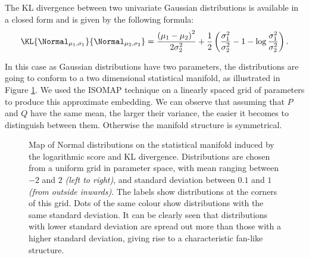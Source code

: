 The KL divergence between two univariate Gaussian distributions is available in a closed form and is given by the following formula:
%
\begin{equation}
	\KL{\Normal_{\mu_1,\sigma_1}}{\Normal_{\mu_2,\sigma_2}} = \frac{\left(\mu_1 - \mu_2\right)^2}{2\sigma_2^2} + \frac{1}{2}\left(\frac{\sigma_1^2}{\sigma_2^2} - 1 - \log\frac{\sigma_1^2}{\sigma_2^2}\right).
\end{equation}

In this case as Gaussian distributions have two parameters, the distributions are going to conform to a two dimensional statistical manifold, as illustrated in Figure \ref{fig:Normal_meanvar}. We used the ISOMAP technique on a linearly spaced grid of parameters to produce this approximate embedding. We can observe that assuming that $P$ and $Q$ have the same mean, the larger their variance, the easier it becomes to distinguish between them. Otherwise the manifold structure is symmetrical.

\begin{figure} %
	\begin{center}
	\end{center}
	\caption[Map of Normal distributions by the KL divergence]{Map of Normal distributions on the statistical manifold induced by the logarithmic score and KL divergence. Distributions are chosen from a uniform grid in parameter space, with mean ranging between $-2$ and $2$ \emph{(left to right)}, and standard deviation between $0.1$ and $1$ \emph{(from outside inwards)}. The labels show distributions at the corners of this grid.  Dots of the same colour show distributions with the same standard deviation. It can be clearly seen that distributions with lower standard deviation are spread out more than those with a higher standard deviation, giving rise to a characteristic fan-like structure.}
	\label{fig:Normal_meanvar}
\end{figure}

